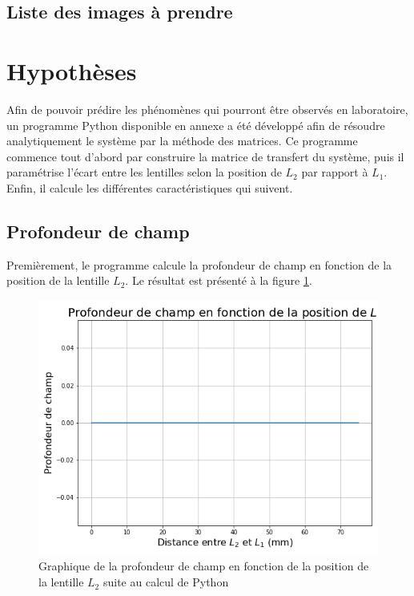 \documentclass[11pt,letterpaper]{article}
\begin{document}


\subsection{Liste des images à prendre}

\section{Hypothèses}


Afin de pouvoir prédire les phénomènes qui pourront être observés en laboratoire, un
programme Python disponible en annexe a été développé afin de résoudre analytiquement
le système par la méthode des matrices. Ce programme commence tout d'abord par construire
la matrice de transfert du système, puis il paramétrise l'écart entre les lentilles selon
la position de $L_2$ par rapport à $L_1$. Enfin, il calcule les différentes caractéristiques
qui suivent.

\subsection{Profondeur de champ}

Premièrement, le programme calcule la profondeur de champ en fonction de la position de
la lentille $L_2$. Le résultat est présenté à la figure \ref{prof_champ_plot}.

\begin{figure}[H]
  \centering
  \includegraphics[scale=0.55]{prof_champ.png}
  \caption{Graphique de la profondeur de champ en fonction de la position de la lentille 
  $L_2$ suite au calcul de Python}
  \label{prof_champ_plot}
\end{figure}
\end{document}
